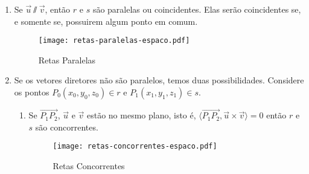 \begin{enumerate}
\item Se $\vec{u}\varparallel\vec{v}$, ent\~ao $r$ e $s$ s\~ao paralelas ou coincidentes. Elas ser\~ao coincidentes se, e somente se, possuirem algum ponto em comum.
\begin{figure}[h]
    \centering
    \caption{Retas Paralelas}
    \texttt{[image: retas-paralelas-espaco.pdf]}
\end{figure}
\item Se os vetores diretores n\~ao s\~ao paralelos, temos duas possibilidades. Considere os pontos $P_0(x_0,y_0,z_0) \in r$ e $P_1(x_1,y_1,z_1) \in s$.
\begin{enumerate}
\item Se $\vec{P_1P_2}$, $\vec{u}$ e $\vec{v}$ est\~ao no mesmo plano, isto \'e, $\langle\vec{P_1P_2}, \vec{u}\times\vec{v}\rangle = 0$ ent\~ao $r$ e $s$ s\~ao concorrentes.
\begin{figure}[h]
    \centering
    \caption{Retas Concorrentes}
    \texttt{[image: retas-concorrentes-espaco.pdf]}

\end{figure}
\end{enumerate}
\end{enumerate}
